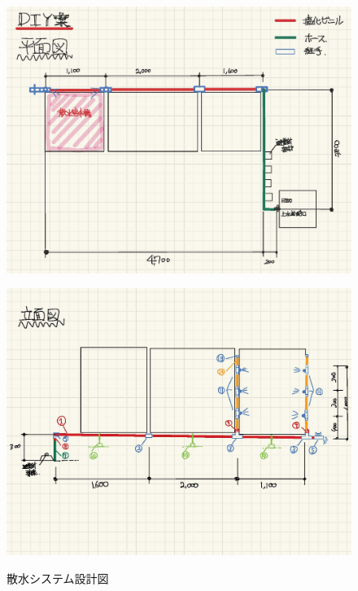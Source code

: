 \documentclass[a4j,fleqn,dvipdfmx,uplatex]{jsarticle}
\begin{document}
\begin{figure}[htb]
  \centering
    \begin{minipage}[b]{0.45\linewidth}
      \centering
      \includegraphics[width=\linewidth]{img/平面図.jpg}
      \label{subfig:平面図}
    \end{minipage}
    \begin{minipage}[b]{0.45\linewidth}
      \centering
      \includegraphics[width=\linewidth]{img/裏手立面図.jpg}
      \label{subfig:裏手立面図}
    \end{minipage}
  \caption{散水システム設計図}
  \label{fig2:watering_sys}
\end{figure}
\end{document}
